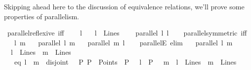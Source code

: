 \begin{isabellebody}
\begin{isamarkuptext}
Skipping ahead here to the discussion of equivalence relations, we'll prove some
properties of parallelism.%
\end{isamarkuptext}\isamarkuptrue%
\isamarkupfalse%
\ parallel{\isacharunderscore}{\kern0pt}reflexive\ {\isacharbrackleft}{\kern0pt}iff{\isacharbrackright}{\kern0pt}{\isacharcolon}{\kern0pt}\ \isanewline
\ \ \ l\isanewline
\ \ \ {\isachardoublequoteopen}l\ {\isasymin}\ Lines{\isachardoublequoteclose}\ \isanewline
\ \ \ {\isachardoublequoteopen}parallel\ l\ l{\isachardoublequoteclose}\isanewline
%
\isadelimproof
\ \ %
\endisadelimproof
%
\isatagproof
{}\isamarkupfalse%
%
\endisatagproof
{\isafoldproof}%
%
\isadelimproof
\isanewline
%
\endisadelimproof
\isanewline
{}\isamarkupfalse%
\ parallel{\isacharunderscore}{\kern0pt}symmetric\ {\isacharbrackleft}{\kern0pt}iff{\isacharbrackright}{\kern0pt}{\isacharcolon}{\kern0pt}\ \isanewline
\ \ \ l\ m\isanewline
\ \ \ {\isachardoublequoteopen}parallel\ l\ m{\isachardoublequoteclose}\isanewline
\ \ \ {\isachardoublequoteopen}parallel\ m\ l{\isachardoublequoteclose}\isanewline
%
\isadelimproof
\ \ %
\endisadelimproof
%
\isatagproof
{}\isamarkupfalse%
%
\endisatagproof
{\isafoldproof}%
%
\isadelimproof
\isanewline
%
\endisadelimproof
\isanewline
\isanewline
\isanewline
{}\isamarkupfalse%
\ parallelE\ {\isacharbrackleft}{\kern0pt}elim{\isacharbrackright}{\kern0pt}{\isacharcolon}{\kern0pt}\isanewline
\ \ \ {\isachardoublequoteopen}parallel\ l\ m{\isachardoublequoteclose}\ \ \isanewline
\ \ {\isachardoublequoteopen}l\ {\isasymin}\ Lines{\isachardoublequoteclose}\ \ {\isachardoublequoteopen}m\ {\isasymin}\ Lines{\isachardoublequoteclose}\isanewline
\ \ \ {\isacharparenleft}{\kern0pt}eq{\isacharparenright}{\kern0pt}\ {\isachardoublequoteopen}l\ {\isacharequal}{\kern0pt}\ m{\isachardoublequoteclose}\ {\isacharbar}{\kern0pt}\ {\isacharparenleft}{\kern0pt}disjoint{\isacharparenright}{\kern0pt}\ {\isachardoublequoteopen}{\isacharparenleft}{\kern0pt}{\isasymnot}\ {\isacharparenleft}{\kern0pt}{\isasymexists}\ P{\isachardot}{\kern0pt}\ P\ {\isasymin}\ Points\ {\isasymand}\ P\ {\isasymlhd}\ \ l\ {\isasymand}\ P\ {\isasymlhd}\ \ m{\isacharparenright}{\kern0pt}{\isacharparenright}{\kern0pt}\ {\isasymand}\ {\isacharparenleft}{\kern0pt}l\ {\isasymin}\ Lines{\isacharparenright}{\kern0pt}\ {\isasymand}\ {\isacharparenleft}{\kern0pt}m\ {\isasymin}\ Lines{\isacharparenright}{\kern0pt}{\isachardoublequoteclose}\isanewline

\end{isabellebody}
